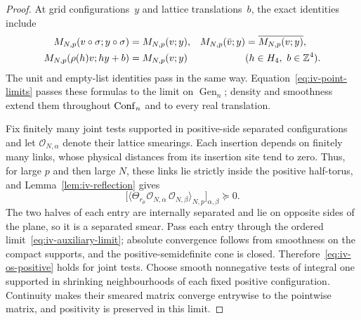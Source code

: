 \begin{proof}
At grid configurations~$y$ and lattice translations~$b$, the exact identities include
\begin{equation*}
\begin{aligned}
 M_{N,p}(v\circ\sigma;y\circ\sigma)&=M_{N,p}(v;y),&
 M_{N,p}(\bar v;y)&=\overline{M_{N,p}(v;y)},\\
 M_{N,p}(\rho(h)v;hy+b)&=M_{N,p}(v;y)
 &&(h\in H_4,\ b\in\mathbb Z^4).
\end{aligned}
\end{equation*}
The unit and empty-list identities pass in the same way.
Equation~\eqref{eq:iv-point-limits} passes these formulas to the limit on $\operatorname{Gen}_n$; density and smoothness extend them throughout $\operatorname{Conf}_{n}$ and to every real translation.

Fix finitely many joint tests supported in positive-side separated configurations and let $\mathcal O_{N,\alpha}$ denote their lattice smearings.
Each insertion depends on finitely many links, whose physical distances from its insertion site tend to zero.
Thus, for large $p$ and then large $N$, these links lie strictly inside the positive half-torus, and Lemma~\ref{lem:iv-reflection} gives
\begin{equation*}
 \bigl[\langle\Theta_{r_\mu}\mathcal O_{N,\alpha}\,\mathcal O_{N,\beta}\rangle_{N,p}\bigr]_{\alpha,\beta}\succeq0.
\end{equation*}
The two halves of each entry are internally separated and lie on opposite sides of the plane, so it is a separated smear.
Pass each entry through the ordered limit~\eqref{eq:iv-auxiliary-limit}; absolute convergence follows from smoothness on the compact supports, and the positive-semidefinite cone is closed.
Therefore~\eqref{eq:iv-os-positive} holds for joint tests.
Choose smooth nonnegative tests of integral one supported in shrinking neighbourhoods of each fixed positive configuration. Continuity makes their smeared matrix converge entrywise to the pointwise matrix, and positivity is preserved in this limit.


\end{proof}
